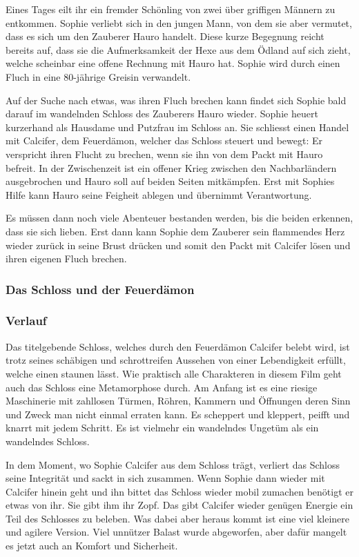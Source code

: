 Eines Tages eilt ihr ein fremder Schönling von zwei über griffigen Männern zu entkommen. Sophie verliebt sich in den jungen Mann, von dem sie aber vermutet, dass es sich um den Zauberer Hauro handelt. Diese kurze Begegnung reicht bereits auf, dass sie die Aufmerksamkeit der Hexe aus dem Ödland auf sich zieht, welche scheinbar eine offene Rechnung mit Hauro hat. Sophie wird durch einen Fluch in eine 80-jährige Greisin verwandelt. 

Auf der Suche nach etwas, was ihren Fluch brechen kann findet sich Sophie bald darauf im wandelnden Schloss des Zauberers Hauro wieder. Sophie heuert kurzerhand als Hausdame und Putzfrau im Schloss an. Sie schliesst einen Handel mit Calcifer, dem Feuerdämon, welcher das Schloss steuert und bewegt: Er verspricht ihren Flucht zu brechen, wenn sie ihn von dem Packt mit Hauro befreit. In der Zwischenzeit ist ein offener Krieg zwischen den Nachbarländern ausgebrochen und Hauro soll auf beiden Seiten mitkämpfen. Erst mit Sophies Hilfe kann Hauro seine Feigheit ablegen und übernimmt Verantwortung. 

Es müssen dann noch viele Abenteuer bestanden werden, bis die beiden erkennen, dass sie sich lieben. Erst dann kann Sophie dem Zauberer sein flammendes Herz wieder zurück in seine Brust drücken und somit den Packt mit Calcifer lösen und ihren eigenen Fluch brechen. 

\subsubsection{Das Schloss und der Feuerdämon}
\subsubsection*{Verlauf}
Das titelgebende Schloss, welches durch den Feuerdämon Calcifer belebt wird, ist trotz seines schäbigen und schrottreifen Aussehen von einer Lebendigkeit erfüllt, welche einen staunen lässt. Wie praktisch alle Charakteren in diesem Film geht auch das Schloss eine Metamorphose durch. Am Anfang ist es eine riesige Maschinerie mit zahllosen Türmen, Röhren, Kammern und Öffnungen deren Sinn und Zweck man nicht einmal erraten kann. Es scheppert und kleppert, peifft und knarrt mit jedem Schritt. Es ist vielmehr ein wandelndes Ungetüm als ein wandelndes Schloss.

In dem Moment, wo Sophie Calcifer aus dem Schloss trägt, verliert das Schloss seine Integrität und sackt in sich zusammen. Wenn Sophie dann wieder mit Calcifer hinein geht und ihn bittet das Schloss wieder mobil zumachen benötigt er etwas von ihr. Sie gibt ihm ihr Zopf. Das gibt Calcifer wieder genügen Energie ein Teil des Schlosses zu beleben. Was dabei aber heraus kommt ist eine viel kleinere und agilere Version. Viel unnützer Balast wurde abgeworfen, aber dafür mangelt es jetzt auch an Komfort und Sicherheit. 

